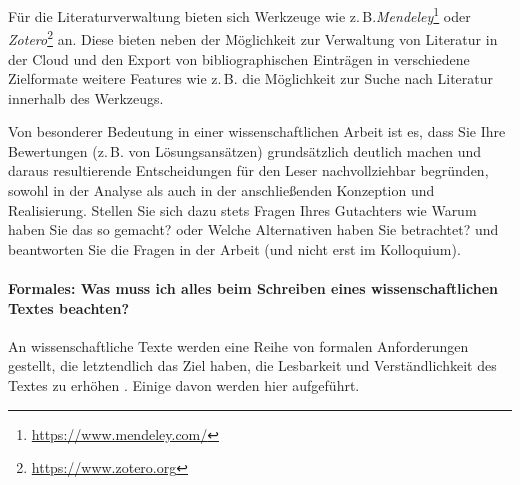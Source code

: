 \documentclass[11pt]{scrartcl}
\newcommand{\qto}[1]{\glqq #1\grqq}				%
\newcommand{\zB}{\mbox{z.\,B.}\xspace}
\begin{document}
Für die Literaturverwaltung bieten sich Werkzeuge wie \zB \emph{Mendeley}\footnote{\label{footnote:mendeley}\url{https://www.mendeley.com/}} oder \emph{Zotero}\footnote{\url{https://www.zotero.org}} an. Diese bieten neben der Möglichkeit zur Verwaltung von Literatur in der Cloud und den Export von bibliographischen Einträgen in verschiedene Zielformate weitere Features wie \zB die Möglichkeit zur Suche nach Literatur innerhalb des Werkzeugs.

Von besonderer Bedeutung in einer wissenschaftlichen Arbeit ist es, dass Sie Ihre Bewertungen (\zB von Lösungsansätzen) grundsätzlich deutlich machen und daraus resultierende Entscheidungen für den Leser nachvollziehbar begründen, sowohl in der Analyse als auch in der anschließenden Konzeption und Realisierung.
Stellen Sie sich dazu stets Fragen Ihres Gutachters wie \qto{Warum haben Sie das so gemacht?} oder \qto{Welche Alternativen haben Sie betrachtet?} und beantworten Sie die Fragen in der Arbeit (und nicht erst im Kolloquium).


\paragraph*{Formales: Was muss ich alles beim Schreiben eines wissenschaftlichen Textes beachten?} An wissenschaftliche Texte werden eine Reihe von formalen Anforderungen gestellt, die letztendlich das Ziel haben, die Lesbarkeit und Verständlichkeit des Textes zu erhöhen \cite{lit:Prevezanos:TechnischesSchreiben}. Einige davon werden hier aufgeführt.
\end{document}
